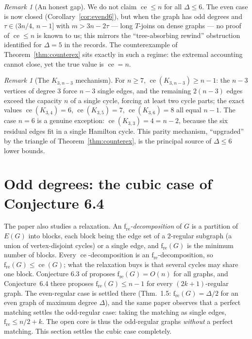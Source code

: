 \documentclass[a4paper,11pt]{amsart}
\theoremstyle{definition}
\theoremstyle{remark}
\newtheorem{remark}[theorem]{Remark}
\newcommand{\ce}{\operatorname{ce}}
\newcommand{\fre}{\operatorname{f_{re}}}
\begin{document}
\begin{remark}[An honest gap]\label{rem:danger}
We do not claim $\ce\le n$ for all $\Delta\le6$. The even case is now closed
(Corollary~\ref{cor:evend6}), but when the graph has odd degrees and $\tau\in(3n/4,\,n-1]$ with
$m>3n-2\tau$ --- long $T$-joins on dense graphs --- no proof of $\ce\le n$ is known to us; this mirrors the
``tree-absorbing rewind'' obstruction identified for $\Delta=5$ in the records. The counterexample of
Theorem~\ref{thm:counterex} sits exactly in such a regime: the extremal accounting cannot close, yet the
true value is $\ce=n$.
\end{remark}

\begin{remark}[The $K_{3,n-3}$ mechanism]\label{rem:k3n}
For $n\ge7$, $\ce(K_{3,n-3})\ge n-1$: the $n-3$ vertices of degree $3$ force $n-3$ single edges, and the
remaining $2(n-3)$ edges exceed the capacity $n$ of a single cycle, forcing at least two cycle parts; the
exact values $\ce(K_{3,4})=6$, $\ce(K_{3,5})=7$, $\ce(K_{3,6})=8$ all equal $n-1$. The case $n=6$ is a
genuine exception: $\ce(K_{3,3})=4=n-2$, because the six residual edges fit in a single Hamilton cycle.
This parity mechanism, ``upgraded'' by the triangle of Theorem~\ref{thm:counterex}, is the principal source
of $\Delta\le6$ lower bounds.
\end{remark}

\section{Odd degrees: the cubic case of Conjecture 6.4}\label{sec:odd}

The paper \cite{AABC25} also studies a relaxation. An \emph{$\fre$-decomposition} of $G$ is a partition of
$E(G)$ into blocks, each block being the edge set of a $2$-regular subgraph (a union of vertex-disjoint
cycles) or a single edge, and $\fre(G)$ is the minimum number of blocks. Every $\ce$-decomposition is an
$\fre$-decomposition, so $\fre(G)\le\ce(G)$; what the relaxation buys is that several cycles may share one
block. Conjecture 6.3 of \cite{AABC25} proposes $\fre(G)=O(n)$ for all graphs, and Conjecture~6.4 there
proposes $\fre(G)\le n-1$ for every $(2k+1)$-regular graph. The even-regular case is settled there
(Thm.~1.5: $\fre(G)=\Delta/2$ for an even graph of maximum degree $\Delta$), and the same paper observes
that a perfect matching settles the odd-regular case: taking the matching as single edges, $\fre\le n/2+k$.
The open core is thus the odd-regular graphs \emph{without} a perfect matching. This section settles the
cubic case completely.
\end{document}
